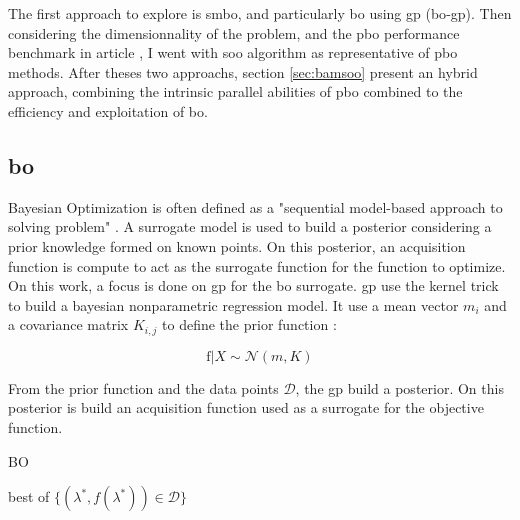 The first approach to explore is \acrfull{smbo}, and particularly \acrfull{bo} using \acrfull{gp} (\acrshort{bo}-\acrshort{gp}). Then considering the dimensionnality of the problem, and the \acrshort{pbo} performance benchmark in article \cite{firmin_fractal-based_2022}, I went with \acrfull{soo} algorithm as representative of \acrshort{pbo} methods. After theses two approachs, section \ref{sec:bamsoo} present an hybrid approach, combining the intrinsic parallel abilities of \acrshort{pbo} combined to the efficiency and exploitation of \acrshort{bo}.

\subsection{\acrfull{bo}}
\label{sec:bo}

Bayesian Optimization is often defined as a "sequential model-based approach to solving problem" \cite{shahriari_taking_2016}. A surrogate model is used to build a posterior considering a prior knowledge formed on known points. On this posterior, an acquisition function is compute to act as the surrogate function for the function to optimize. On this work, a focus is done on \acrshort{gp} for the \acrshort{bo} surrogate. \acrshort{gp} use the kernel trick to build a bayesian nonparametric regression model. It use a mean vector $m_i$ and a covariance matrix $K_{i,j}$ to define the prior function : 

\begin{equation}
    \text{f} | X \sim  \mathcal N (m,K)
    \label{eq:prior_gp}
\end{equation}

From the prior function and the data points $\mathcal D$, the \acrshort{gp} build a posterior. On this posterior is build an acquisition function used as a surrogate for the objective function.

\begin{algorithm}[h]
    \caption{BO}
    \label{algo:bo}
    
    
    
    \Return best of $\{(\lambda^*, f(\lambda^*)) \in \mathcal{D}\}$
\end{algorithm}
    

